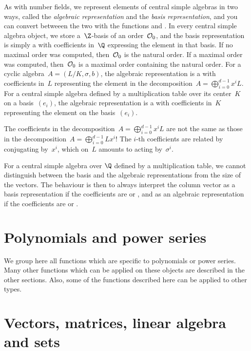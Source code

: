 As with number fields, we represent elements of central simple algebras
in two ways, called the \emph{algebraic representation} and the \emph{basis
representation}, and you can convert betweeen the two with the functions
 and . In every central simple algebra
object, we store a~$\Z$-basis of an order~${\cal O}_0$, and the basis
representation is simply a  with coefficients in~$\Q$ expressing the
element in that basis. If no maximal order was computed, then~${\cal O}_0$ is
the natural order. If a maximal order was computed, then~${\cal O}_0$ is a
maximal order containing the natural order. For a cyclic algebra~$A =
(L/K,\sigma,b)$, the algebraic representation is a  with coefficients
in~$L$ representing the element in the decomposition~$A =
\bigoplus_{i=0}^{d-1}x^iL$. For a central simple algebra defined by a
multiplication table over its center~$K$ on a basis~$(e_i)$, the algebraic
representation is a  with coefficients in~$K$ representing the element
on the basis~$(e_i)$.

 The coefficients in the decomposition~$A =
\bigoplus_{i=0}^{d-1}x^iL$ are not the same as those in the decomposition~$A
= \bigoplus_{i=0}^{d-1}Lx^i$! The $i$-th coefficients are related by
conjugating by~$x^i$, which on~$L$ amounts to acting by~$\sigma^i$.

 For a central simple algebra over $\Q$ defined by a
multiplication table, we cannot distinguish between the basis and the algebraic
representations from the size of the vectors. The behaviour is then to always
interpret the column vector as a basis representation if the coefficients are
 or , and as an algebraic representation if the coefficients
are  or .


\section{Polynomials and power series}

We group here all functions which are specific to polynomials or power
series. Many other functions which can be applied on these objects are
described in the other sections. Also, some of the functions described here
can be applied to other types.


\section{Vectors, matrices, linear algebra and sets}
\label{se:linear_algebra}

